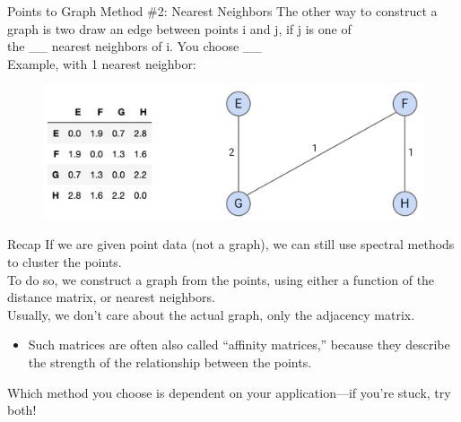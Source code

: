 \documentclass[aspectratio=169]{../latex_main/tntbeamer}  %
\begin{document}
	
	\begin{frame}{Points to Graph Method \#2: Nearest Neighbors}
	    The other way to construct a graph is two draw an edge between points i and j, if j is one of\\ the \_\_ nearest neighbors of i. You choose \_\_\\
        Example, with 1 nearest neighbor:
	    \begin{figure}
	        \centering
	        \includegraphics[scale=.48]{Bild21}
	    \end{figure}
	\end{frame}
	
	
	
	\begin{frame}{Recap}
	    If we are given point data (not a graph), we can still use spectral methods to cluster the points.\\
	    \bigskip
	    To do so, we construct a graph from the points, using either a function of the distance matrix, or nearest neighbors.\\
	    \bigskip
	    Usually, we don’t care about the actual graph, only the adjacency matrix.
	    \begin{itemize}
	        \item Such matrices are often also called “affinity matrices,” because they describe the strength of the relationship between the points.
	    \end{itemize}
	    \bigskip
	    Which method you choose is dependent on your application—if you’re stuck, try both!
	\end{frame}
\end{document}
